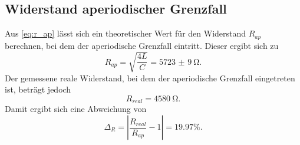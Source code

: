 \subsection{Widerstand aperiodischer Grenzfall}\label{sec:ap}
Aus \autoref{eq:r_ap} lässt sich ein theoretischer Wert für den Widerstand $R_{ap}$ berechnen, bei dem der aperiodische Grenzfall eintritt.
Dieser ergibt sich zu
\begin{equation*}
  R_{ap} = \sqrt{\frac{4L}{C}} = \SI{5723(9)}{\ohm}.
\end{equation*}
Der gemessene reale Widerstand, bei dem der aperiodische Grenzfall eingetreten ist, beträgt jedoch
\begin{equation*}
  R_{real} = \SI{4580}{\ohm}.
\end{equation*}
Damit ergibt sich eine Abweichung von
\begin{equation*}
  \Delta_R = |\frac{R_{real}}{R_{ap}} - 1| = 19.97\%.
\end{equation*}

